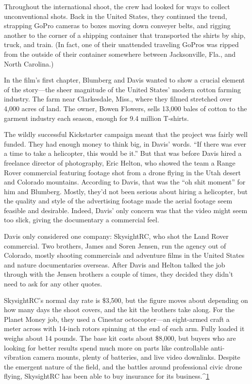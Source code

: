 Throughout the international shoot, the crew had looked for ways to collect
unconventional shots. Back in the United States, they continued the
trend, strapping GoPro cameras to boxes moving down conveyer belts, and
rigging another to the corner of a shipping container that transported the
shirts by ship, truck, and train. (In fact, one of their unattended traveling
GoPros was ripped from the outside of their container somewhere between
Jacksonville, Fla., and North Carolina.)

In the film's first chapter, Blumberg and Davis wanted to show a crucial
element of the story—the sheer magnitude of the United States' modern
cotton farming industry. The farm near Clarkesdale, Miss., where they
filmed stretched over 4,000 acres of land. The owner, Bowen Flowers, sells
13,000 bales of cotton to the garment industry each season, enough for
9.4 million T-shirts.

The wildly successful Kickstarter campaign meant that the project was fairly
well funded. They had enough money to think big, in Davis' words. ``If there
was ever a time to take a helicopter, this would be it.'' But that was before
Davis hired a freelance director of photography, Eric Helton, who showed
the team a Range Rover commercial featuring footage shot from a drone
flying in the Utah desert and Colorado mountains. According to Davis, that
was the ``oh shit moment'' for him and Blumberg. Mostly, they'd not been
serious about hiring a helicopter, but the quality and style of the advertising
footage made the aerial footage seem feasible and desirable. Indeed, Davis'
only concern was that the video might seem too slick, giving the documentary
a commercial feel.

Davis only considered one company: SkysightRC, who shot the Land Rover
commercial. Two brothers, James and Soren Jensen, run the agency out of
Colorado, mostly shooting commercials and adventure films in the United
States and nature documentaries overseas. After Davis and Helton talked
the job through with the Jensen brothers a couple of times, they decided
they didn't need to ask for any other quotes.

SkysightRC's normal day rate is \$3,500, but the figure moves about depending
on how many days the shoot covers, and the kit the brothers take along.
For the Planet Money job, they used a Cinestar octocopter—an eight-armed
craft a meter across with 14-inch rotors spinning at the end of each arm.
Fully loaded it weighs about 14 pounds. The base kit costs about \$8,000, but
buyers who are looking for better results spend much more on parts like
controllable anti-vibration camera mounts, plenty of batteries, and live
video downlinks. Despite the emergent nature of the field, and the battles
around professional civic drone flying, SkysightRC has been able to buy
insurance for its business.^{\href{#endnotes-planet-money}{1}}


